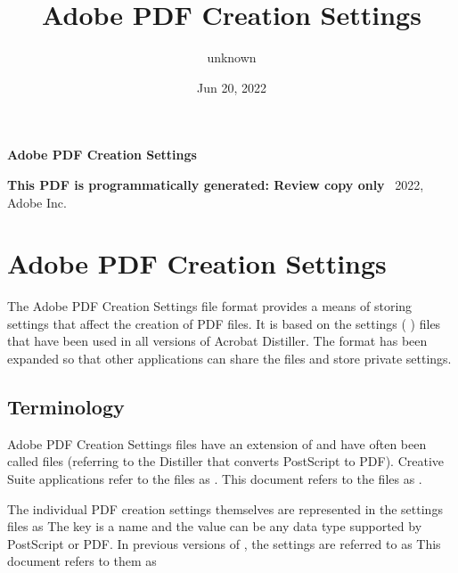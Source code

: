 \documentclass[letterpaper,12pt,english,openany,oneside]{sphinxmanual}
\title{Adobe PDF Creation Settings}
\date{Jun 20, 2022}
\author{unknown}
\begin{document}
\pagestyle{empty}

    \begin{titlepage}
        \begin{figure}[h]
        \end{figure}
        \centering
        \vspace*{40mm}
        \textbf{\Huge Adobe PDF Creation Settings}

        \vspace{15mm}
        \Large \textbf{{This PDF is programmatically generated: Review copy only}}
        \vfill
        \small \textcopyright\ 2022, Adobe Inc.
    \end{titlepage}
    \clearpage
    \tableofcontents
    \clearpage
    
\pagestyle{plain}

\pagestyle{normal}
\label{\detokenize{toc::doc}}



\chapter{Adobe PDF Creation Settings}
\label{\detokenize{index:adobe-pdf-creation-settings}}\label{\detokenize{index::doc}}
The Adobe PDF Creation Settings file format provides a means of storing settings that affect the creation of PDF files. It is based on the settings ( ) files that have been used in all versions of Acrobat Distiller. The format has been expanded so that other applications can share the files and store private settings.


\section{Terminology}
\label{\detokenize{index:terminology}}
Adobe PDF Creation Settings files have an extension of  and have often been called  files (referring to the Distiller  that converts PostScript to PDF). Creative Suite applications refer to the files as  . This document refers to the files as  .

The individual PDF creation settings themselves are represented in the settings files as  The key is a name and the value can be any data type supported by PostScript or PDF. In previous versions of  , the settings are referred to as  This document refers to them as 
\end{document}
